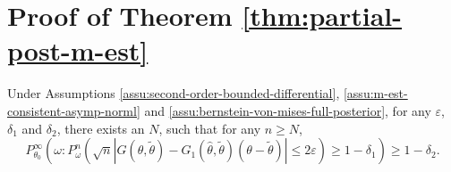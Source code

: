 \section{\label{sec:Proof-of-Theorem-2}Proof of Theorem \ref{thm:partial-post-m-est}}
\begin{lem}
\label{lem:taylor-expansion-in-dist}Under Assumptions \ref{assu:second-order-bounded-differential},
\ref{assu:m-est-consistent-asymp-norml} and \ref{assu:bernstein-von-mises-full-posterior},
for any $\varepsilon$, $\delta_{1}$ and $\delta_{2}$, there exists
an $N$, such that for any $n\ge N$, 
\[
P_{\theta_{0}}^{\infty}\left(\omega:P_{\omega}^{n}\left(\sqrt{n}\left|G\left(\theta,\tilde{\theta}\right)-G_{1}\left(\hat{\theta},\tilde{\theta}\right)\left(\theta-\tilde{\theta}\right)\right|\le2\varepsilon\right)\ge1-\delta_{1}\right)\ge1-\delta_{2}.
\]
\end{lem}

